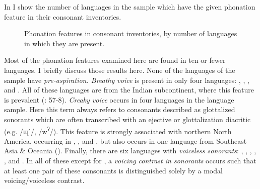   In  I show the number of languages in the sample which have the given phonation feature in their consonant inventories.


\begin{figure} 
\caption{\label{fig:4.4} Phonation features in consonant inventories, by number of languages in which they are present.}
\end{figure}

  Most of the phonation features examined here are found in ten or fewer languages. I briefly discuss those results here. None of the languages of the sample have \textit{pre-aspiration. Breathy voice} is present in only four languages: , , , and . All of these languages are from the Indian subcontinent, where this feature is prevalent (\citealt{LadefogedMaddieson1996}: 57-8). \textit{Creaky voice} occurs in four languages in the language sample. Here this term always refers to consonants described as glottalized sonorants which are often transcribed with an ejective or glottalization diacritic (e.g. /ɰ’/, /w\textsuperscript{ʔ}/). This feature is strongly associated with northern North America, occurring in , , and , but also occurs in one language from Southeast Asia \& Oceania (). Finally, there are six languages with \textit{voiceless sonorants}: , , , , , and . In all of these except for , a \textit{voicing contrast in sonorants} occurs such that at least one pair of these consonants is distinguished solely by a modal voicing/voiceless contrast.

